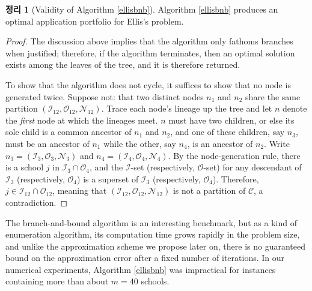 \documentclass[12pt]{article} %
\newtheorem{theorem}{Theorem}
\theoremstyle{definition}
\newtheorem{theorem}{정리}
\theoremstyle{definition}
\begin{document}
\begin{theorem}[Validity of Algorithm \ref{ellisbnb}]
Algorithm \ref{ellisbnb} produces an optimal application portfolio for Ellis's problem.
\end{theorem}

\begin{proof}
The discussion above implies that the algorithm only fathoms branches when justified; therefore, if the algorithm terminates, then an optimal solution exists among the leaves of the tree, and it is therefore returned.

To show that the algorithm does not cycle, it suffices to show that no node is generated twice. Suppose not: that two distinct nodes $n_1$ and $n_2$ share the same partition $(\mathcal{I}_{12}, \mathcal{O}_{12}, \mathcal{N}_{12})$. Trace each node's lineage up the tree and let $n$ denote the \emph{first} node at which the lineages meet. $n$ must have two children, or else its sole child is a common ancestor of $n_1$ and $n_2$, and one of these children, say $n_3$, must be an ancestor of $n_1$ while the other, say $n_4$, is an ancestor of $n_2$.  Write $n_3 = (\mathcal{I}_{3}, \mathcal{O}_{3}, \mathcal{N}_{3})$ and $n_4 = (\mathcal{I}_{4}, \mathcal{O}_{4}, \mathcal{N}_{4})$. By the node-generation rule, there is a school $j$ in $\mathcal{I}_3 \cap \mathcal{O}_4$, and the $\mathcal{I}$-set (respectively, $\mathcal{O}$-set) for any descendant of $\mathcal{I}_3$ (respectively, $\mathcal{O}_4$) is a superset of  $\mathcal{I}_3$ (respectively, $\mathcal{O}_4$). Therefore, $j \in \mathcal{I}_{12} \cap \mathcal{O}_{12}$, meaning that $(\mathcal{I}_{12}, \mathcal{O}_{12}, \mathcal{N}_{12})$ is not a partition of $\mathcal{C}$, a contradiction. 
\end{proof}

The branch-and-bound algorithm is an interesting benchmark, but as a kind of enumeration algorithm, its computation time grows rapidly in the problem size, and unlike the approximation scheme we propose later on, there is no guaranteed bound on the approximation error after a fixed number of iterations. In our numerical experiments, Algorithm \ref{ellisbnb} was impractical for instances containing more than about $m=40$ schools. 
\end{document}
